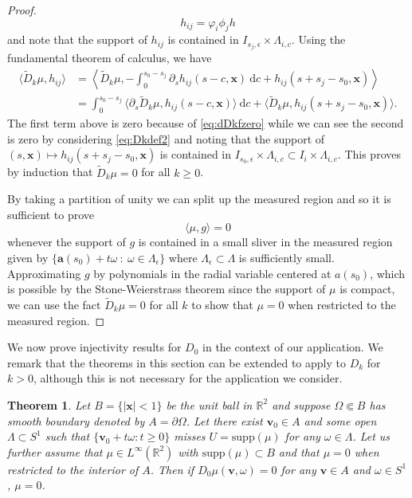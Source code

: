 \documentclass[a4paper,12pt]{amsart}
\numberwithin{equation}{section}
\theoremstyle{plain}
\newtheorem{theorem}{Theorem}
\numberwithin{theorem}{section}
\theoremstyle{definition}
\theoremstyle{remark}
\newtheorem{remark}[theorem]{Remark}
\theoremstyle{remark}
\theoremstyle{remark}
\newcommand{\dd}{\mathrm{d}}  %
\newcommand{\va}{\mathbf{a}}
\newcommand{\vv}{{\mathbf{v}}}
\newcommand{\vx}{{\mathbf{x}}}
\begin{document}
{\begin{proof}
\[h_{ij} = \varphi_i \phi_j h
\]
and note that the support of $h_{ij}$ is contained in $I_{s_j,\epsilon} \times \Lambda_{i,c}$. Using the fundamental theorem of calculus, we have
\[
\begin{split}
\langle \widetilde{D}_k \mu, h_{ij} \rangle & = \left \langle \widetilde{D}_k \mu, -\int_0^{s_0-s_j} \partial_s h_{ij}(s-c,\vx) \ \mathrm{d}c + h_{ij}(s+s_j - s_0,\vx) \right \rangle\\
& = \int_{0}^{s_0-s_j} \langle \partial_s \widetilde{D}_k \mu, h_{ij}(s-c,\vx)\rangle \ \dd c + \langle \widetilde{D}_k \mu, h_{ij} (s+s_j-s_0,\vx) \rangle.
\end{split}
\]
The first term above is zero because of \eqref{eq:dDkfzero} while we can see the second is zero by considering \eqref{eq:Dkdef2} and noting that the support of $(s,\vx) \mapsto h_{ij}(s+s_j-s_0,\vx)$ is contained in $I_{s_0,\epsilon}\times \Lambda_{i,c} \subset I_i \times \Lambda_{i,c}$. This proves by induction that $\widetilde{D}_k \mu = 0$ for all $k \geq 0$.

By taking a partition of unity we can split up the measured region and so it is sufficient to prove
\[
\langle \mu, g \rangle = 0
\]
whenever the support of $g$ is contained in a small sliver in the measured region given by $\{ \va(s_0) + t \omega \ : \ \omega \in \Lambda_\epsilon\}$ where $\Lambda_\epsilon \subset \Lambda$ is sufficiently small. Approximating $g$ by polynomials in the radial variable centered at $a(s_0)$, which is possible by the Stone-Weierstrass theorem since the support of $\mu$ is compact, we can use the fact $\widetilde{D}_k 
\mu = 0$ for all $k$ to show that $\mu = 0$ when restricted to the measured region.
\end{proof}


We now prove injectivity results for $D_0$ in the context of our application. We remark that the theorems in this section can be extended to apply to $D_k$ for $k > 0$, although this is not necessary for the application we consider.

\begin{theorem}\label{rec_mu}
Let $B = \{|\vx| <1\}$ be the unit ball in $\mathbb{R}^2$ and suppose $\Omega \Subset B$ has smooth boundary denoted by $A = \partial \Omega$. Let there exist $\vv_0 \in A$ and some open $\Lambda \subset S^1$ such that $\{\vv_0 + t\omega : t\geq 0\}$ misses $U = \text{supp}(\mu)$ for any $\omega \in \Lambda$. Let us further assume that $\mu \in L^\infty(\mathbb{R}^2)$ with $\text{supp}(\mu) \subset B$ and that $\mu = 0$ when restricted to the interior of $A$. Then if $D_0\mu(\vv,\omega) = 0$ for any $\vv\in A$ and $\omega \in S^1$, $\mu = 0$.
\end{theorem}

}
\end{document}

